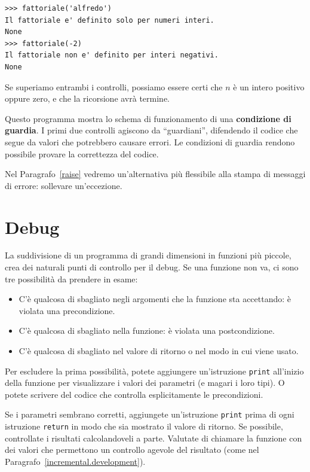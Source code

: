 \documentclass[10pt]{book}
\begin{document}
\begin{verbatim}
>>> fattoriale('alfredo')
Il fattoriale e' definito solo per numeri interi.
None
>>> fattoriale(-2)
Il fattoriale non e' definito per interi negativi.
None
\end{verbatim}
% 
Se superiamo entrambi i controlli, possiamo essere
   certi che $n$ è un intero positivo oppure zero, e che la ricorsione avrà
   termine.

Questo programma mostra lo schema di funzionamento di una {\bf condizione di guardia}.
I primi due controlli agiscono da ``guardiani'', difendendo il codice che segue da valori che potrebbero causare errori. Le condizioni di guardia rendono possibile provare la correttezza del codice.

Nel Paragrafo~\ref{raise} vedremo un'alternativa più flessibile alla stampa di messaggi di errore: sollevare un'eccezione.


\section{Debug}
\label{factdebug}

La suddivisione di un programma di grandi dimensioni in funzioni più piccole, crea dei naturali punti di controllo per il debug.  
Se una funzione non va, ci sono tre possibilità da prendere in esame:

\begin{itemize}

\item C'è qualcosa di sbagliato negli argomenti che la funzione sta accettando: è violata una precondizione.

\item C'è qualcosa di sbagliato nella funzione: è violata una postcondizione.

\item C'è qualcosa di sbagliato nel valore di ritorno o nel modo in cui viene usato.

\end{itemize}

Per escludere la prima possibilità, potete aggiungere un'istruzione {\tt print} all'inizio della funzione per visualizzare i valori dei parametri (e magari i loro tipi). O potete scrivere del codice che controlla esplicitamente le precondizioni.

Se i parametri sembrano corretti, aggiungete un'istruzione {\tt print} prima di ogni istruzione {\tt return} in modo che sia mostrato il valore di ritorno. Se possibile, controllate i risultati calcolandoveli a parte. Valutate di chiamare la funzione con dei valori che permettono un controllo agevole del risultato (come nel Paragrafo~\ref{incremental.development}).
\end{document}
